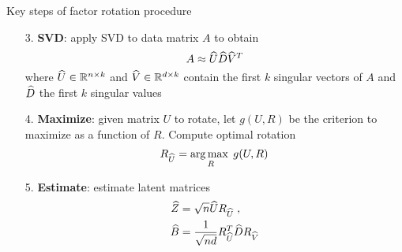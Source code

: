 \documentclass[9pt]{beamer}
\begin{document}



\addtocounter{framenumber}{-1}
\begin{frame}{Key steps of factor rotation procedure}
\begin{enumerate}
\setlength\itemsep{2em}

\item[3.]
\textbf{SVD}: apply SVD to data matrix $A$ to obtain
\[
A \approx \widehat{U}\widehat{D}\widehat{V}^T
\]
where $\widehat{U}\in\mathbb{R}^{n\times k}$ and $\widehat{V}\in\mathbb{R}^{d\times k}$ contain the first $k$ singular vectors of $A$ and $\widehat{D}$ the first $k$ singular values

\item[4.]
\textbf{Maximize}: given matrix $U$ to rotate, let $g(U,R)$ be the criterion to maximize as a function of $R$. Compute optimal rotation
\[
R_{\widehat{U}} = \operatorname*{arg\,max\;}_R g(U,R)
\]

\item[5.]
\textbf{Estimate}: estimate latent matrices
\begin{align*}
\widehat{Z} &= \sqrt{n}\widehat{U} R_{\widehat{U}} \;, \\
\widehat{B} &= \frac{1}{\sqrt{nd}}R_{\widehat{U}}^T\widehat{D} R_{\widehat{V}}
\end{align*}

\end{enumerate}
\end{frame}
\end{document}
